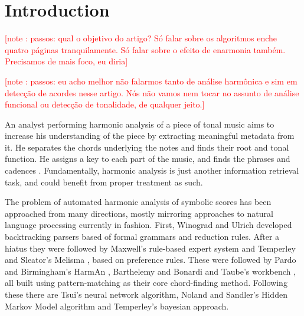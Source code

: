 \documentclass{article}
\title{}
\newcounter{notecounter}
\newcommand{\note}[1]{
  \addtocounter{notecounter}{1}
  \textcolor{red}{[note \arabic{notecounter}: #1]}
}
\begin{document}
\graphicspath{{figs/}{data/}}
\maketitle

\begin{abstract}
\end{abstract}

\section{Introduction}
\label{sec:introduction}

\note{passos: qual o objetivo do artigo? Só falar sobre os algoritmos
  enche quatro páginas tranquilamente. Só falar sobre o efeito de
  enarmonia também. Precisamos de mais foco, eu diria}

\note{passos: eu acho melhor não falarmos tanto de análise harmônica e
  sim em detecção de acordes nesse artigo. Nós não vamos nem tocar no
  assunto de análise funcional ou detecção de tonalidade, de qualquer
  jeito.}

An analyst performing harmonic analysis of a piece of tonal music aims
to increase his understanding of the piece by extracting meaningful
metadata from it.  He separates the chords underlying the notes and
finds their root and tonal function.  He assigns a key to each part of
the music, and finds the phrases and cadences .  Fundamentally,
harmonic analysis is just another information retrieval task, and
could benefit from proper treatment as such.

The problem of automated harmonic analysis of symbolic scores has been
approached from many directions, mostly mirroring approaches to
natural language processing currently in fashion.  First, Winograd
\cite{winograd:linguistics} and Ulrich \cite{ulrich:analysis}
developed backtracking parsers based of formal grammars and reduction
rules.  After a hiatus they were followed by Maxwell's
\cite{maxwell:expert} rule-based expert system and Temperley and
Sleator's Melisma \cite{temperley.ea:modeling}, based on preference
rules.  These were followed by Pardo and Birmingham's HarmAn
\cite{pardo.ea:automated}, Barthelemy and Bonardi
\cite{barthelemy.ea:figured} and Taube's workbench
\cite{taube:automatic}, all built using pattern-matching as their core
chord-finding method.  Following these there are Tsui's
\cite{tsui:harmonic} neural network algorithm, Noland and Sandler's
\cite{noland.ea:key} Hidden Markov Model algorithm and Temperley's
\cite{temperley:bayesian} bayesian approach.
\end{document}
